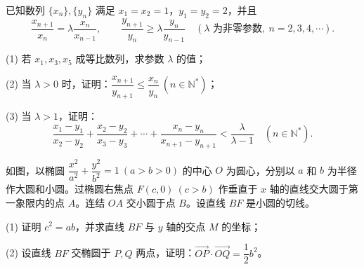 \begin{question}

已知数列 \(\{x_n\},\{y_n\}\) 满足 \(x_1=x_2=1\)，\(y_1=y_2=2\)，并且
\nopagebreak[4]
\[
\frac{x_{n+1}}{x_n}=\lambda\frac{x_n}{x_{n-1}},\qquad
\frac{y_{n+1}}{y_n}\geq\lambda\frac{y_n}{y_{n-1}}
\quad(\lambda\text{ 为非零参数},\ n=2,3,4,\cdots).
\]

(1) 若 \(x_1,x_3,x_5\) 成等比数列，求参数 \(\lambda\) 的值；

(2) 当 \(\lambda>0\) 时，证明：\(\dfrac{x_{n+1}}{y_{n+1}}\leq\dfrac{x_n}{y_n}\ (n\in\mathbb N^*)\)；

(3) 当 \(\lambda>1\)，证明：
\nopagebreak[4]
\[
\frac{x_1-y_1}{x_2-y_2}+\frac{x_2-y_2}{x_3-y_3}+\cdots+\frac{x_n-y_n}{x_{n+1}-y_{n+1}}<\frac{\lambda}{\lambda-1}\quad(n\in\mathbb N^*).
\]

\Needspace{0.4\textheight}
\end{question}
\begin{question}

如图，以椭圆 \(\dfrac{x^2}{a^2}+\dfrac{y^2}{b^2}=1\ (a>b>0)\) 的中心 \(O\) 为圆心，分别以 \(a\) 和 \(b\) 为半径作大圆和小圆。过椭圆右焦点 \(F(c,0)\ (c>b)\) 作垂直于 \(x\) 轴的直线交大圆于第一象限内的点 \(A\)。连结 \(OA\) 交小圆于点 \(B\)。设直线 \(BF\) 是小圆的切线。

(1) 证明 \(c^2=ab\)，并求直线 \(BF\) 与 \(y\) 轴的交点 \(M\) 的坐标；

(2) 设直线 \(BF\) 交椭圆于 \(P,Q\) 两点，证明：\(\overrightarrow{OP}\cdot\overrightarrow{OQ}=\dfrac12b^2\)。
\nopagebreak[4]
\begin{center}\end{center}
\nopagebreak[4]

\end{question}